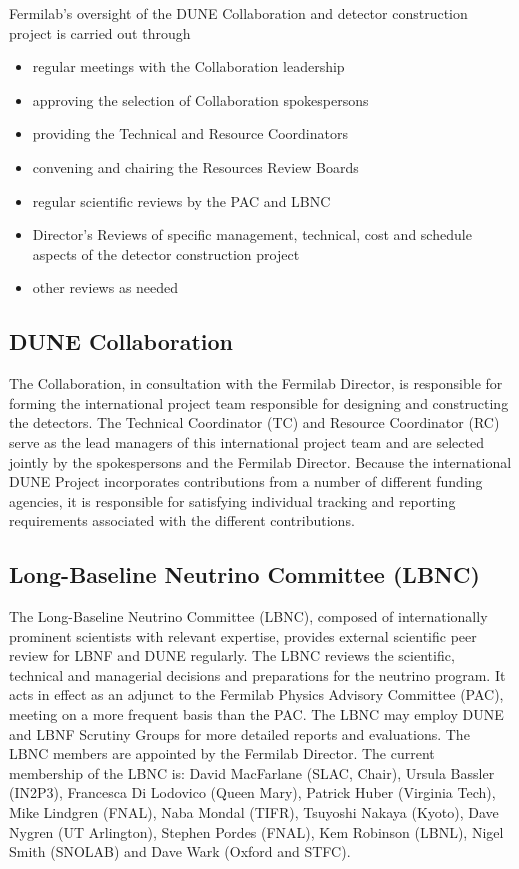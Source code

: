 Fermilab's oversight of the DUNE Collaboration and detector
construction project is carried out through
\begin{itemize}
\item regular meetings with the Collaboration leadership
\item approving the selection of Collaboration spokespersons
\item  providing the Technical and Resource Coordinators
\item  convening and chairing the Resources Review Boards
\item  regular scientific reviews by the PAC and LBNC
\item  Director's Reviews of specific management, technical,
cost and schedule aspects of the detector construction project
\item other reviews as needed
\end{itemize}

\subsection{DUNE Collaboration}	

The Collaboration, in consultation with the Fermilab Director,
is responsible for forming the international project team 
responsible for designing and constructing the detectors.  
The Technical Coordinator
(TC) and Resource Coordinator (RC) serve as the lead managers
of this international project team and are selected jointly by
the spokespersons and the Fermilab Director.  Because the international DUNE
Project incorporates contributions from a number of different
funding agencies, it %
is responsible for
satisfying individual tracking and reporting requirements associated
with %
the different contributions.

\subsection{Long-Baseline Neutrino Committee (LBNC)}

The Long-Baseline Neutrino Committee (LBNC), composed
of internationally prominent scientists with relevant expertise,
provides external scientific peer review for LBNF and DUNE %
regularly.
The LBNC reviews the scientific, technical and managerial
decisions and preparations for the neutrino program.
It acts in effect %
as an adjunct to the Fermilab Physics Advisory Committee
(PAC), meeting on a more frequent basis than the PAC.
The LBNC may employ DUNE and LBNF Scrutiny Groups for more
detailed reports and evaluations. The LBNC members are appointed by the
Fermilab Director. The current membership of the LBNC is:
%
David MacFarlane (SLAC, Chair),
Ursula Bassler (IN2P3),
Francesca Di Lodovico (Queen Mary),
Patrick Huber (Virginia Tech),
Mike Lindgren (FNAL),
Naba Mondal (TIFR),
Tsuyoshi Nakaya (Kyoto),
Dave Nygren (UT Arlington),
Stephen Pordes (FNAL),
Kem Robinson (LBNL),
Nigel Smith (SNOLAB) and
Dave Wark (Oxford and STFC).

